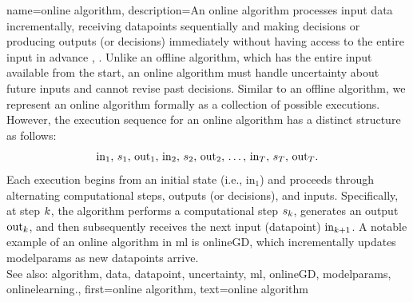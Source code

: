 {name={online algorithm},
	description={An online \gls{algorithm} processes input \gls{data} incrementally, 
		receiving \glspl{datapoint} sequentially and making decisions or producing outputs (or decisions) immediately 
		without having access to the entire input in advance \cite{PredictionLearningGames}, \cite{HazanOCO}. 
		Unlike an offline \gls{algorithm}, which has the entire input available from the start, an online \gls{algorithm} 
		must handle \gls{uncertainty} about future inputs and cannot revise past decisions. Similar to an 
		offline \gls{algorithm}, we represent an online \gls{algorithm} formally as a collection of possible 
		executions. However, the execution sequence for an online \gls{algorithm} has a distinct structure as follows:
		$${\rm in}_{1}, \,s_1, \,{\rm out}_{1}, \,{\rm in}_{2}, \,s_2, \,{\rm out}_{2}, \,\ldots, \,{\rm in}_{T}, \,s_T, \,{\rm out}_{T}.$$ 
		Each execution begins from an initial state (i.e., \(\text{in}_{1}\)) and proceeds through alternating 
		computational steps, outputs (or decisions), and inputs. Specifically, at step \(k\), 
		the \gls{algorithm} performs a computational step \(s_{k}\), generates an output \(\text{out}_{k}\), 
		and then subsequently receives the next input (\gls{datapoint}) \(\text{in}_{k+1}\). A 
		notable example of an online \gls{algorithm} in \gls{ml} is \gls{onlineGD}, which incrementally 
		updates \gls{modelparams} as new \glspl{datapoint} arrive. 
					\\ 
		See also: \gls{algorithm}, \gls{data}, \gls{datapoint}, \gls{uncertainty}, \gls{ml}, \gls{onlineGD}, \gls{modelparams}, \gls{onlinelearning}.},
	first={online algorithm},
	text={online algorithm} 
}


